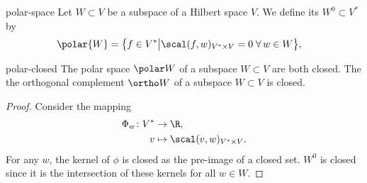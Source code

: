 \begin{Definition}{polar-space}
  Let $W\subset V$ be a subspace of a Hilbert space $V$. We define its
   $W^0\subset V^*$ by
  \begin{gather}
    \begin{split}
      \polar{W} &= \bigl\{f\in V^* \big| \scal(f,w)_{V^*\times V} = 0
      \;\forall\,w\in W\bigr\},
    \end{split}
  \end{gather}
\end{Definition}

\begin{Lemma}{polar-closed}
  The polar space $\polar W$ of a subspace $W\subset V$ are both
  closed.  The the orthogonal complement $\ortho W$ of a subspace
  $W\subset V$ is closed.
\end{Lemma}

\begin{proof}
  Consider the mapping
  \begin{align*}
    \Phi_w\colon V^* &\to \R,\\
    v&\mapsto \scal(v,w)_{V^*\times V}.
  \end{align*}
  For any $w$, the kernel of $\phi$ is closed as
  the pre-image of a closed set. $W^0$ is closed since it is the
  intersection of these kernels for all $w\in W$.
\end{proof}

